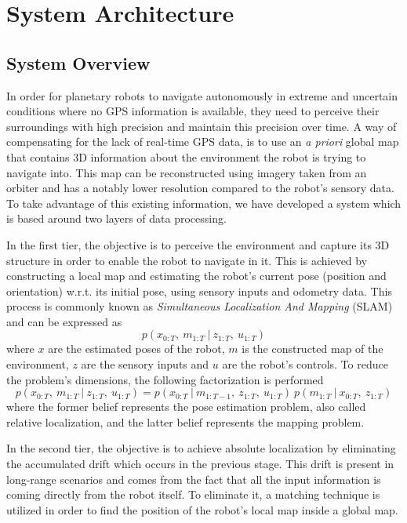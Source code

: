 \label{Chapter2}

\chapter{System Architecture}

\section{System Overview} \label{system_overview}

In order for planetary robots to navigate autonomously in extreme and
uncertain conditions where no GPS information is available,
they need to perceive their surroundings with high precision and
maintain this precision over time.
A way of compensating for the lack of real-time GPS data, is to use
an \textit{a priori} global map that contains 3D information about the
environment the robot is trying to navigate into.
This map can be reconstructed using imagery taken from an orbiter and
has a notably lower resolution compared to the robot's sensory data.
To take advantage of this existing information, we have developed a system
which is based around two layers of data processing.

In the first tier, the objective is to perceive the environment and
capture its 3D structure in order to enable the robot to navigate in it.
This is achieved by constructing a local map and estimating the robot's
current pose (position and orientation) w.r.t. its initial pose,
using sensory inputs and odometry data.
This process is commonly known as
\textit{Simultaneous Localization And Mapping} (SLAM) and can be expressed as
\begin{equation}
    p(x_{0:T} ,\ m_{1:T} \ | \ z_{1:T} ,\ u_{1:T})
\end{equation}
where
$x$ are the estimated poses of the robot,
$m$ is the constructed map of the environment,
$z$ are the sensory inputs and
$u$ are the robot's controls.
To reduce the problem's dimensions, the following factorization is performed
\begin{equation}
    p(x_{0:T} ,\ m_{1:T} \ | \ z_{1:T} ,\ u_{1:T}) =
    p(x_{0:T} \ | \ m_{1:T-1} ,\ z_{1:T} ,\ u_{1:T}) \
    p(m_{1:T} \ | \ x_{0:T} ,\ z_{1:T})
\end{equation}
where
the former belief represents the pose estimation problem, also called
relative localization, and the latter belief represents the mapping problem.

In the second tier, the objective is to achieve absolute localization by
eliminating the accumulated drift which occurs in the previous stage.
This drift is present in long-range scenarios and comes from the fact that
all the input information is coming directly from the robot itself.
To eliminate it, a matching technique is utilized in order to find the
position of the robot's local map inside a global map.

